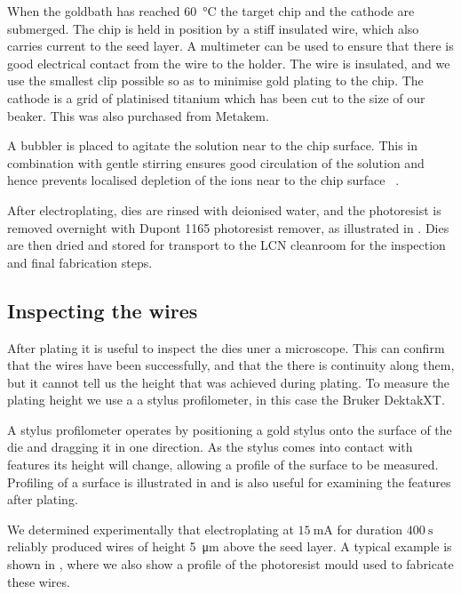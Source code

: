 When the goldbath has reached \SI{60}{\celsius} the target chip and the cathode
are submerged. The chip is held in position by a stiff insulated wire, which
also carries current to the seed layer. A multimeter can be used to ensure that
there is good electrical contact from the wire to the holder. The wire is
insulated, and we use the smallest clip possible so as to minimise gold plating
to the chip.  The cathode is a grid of platinised titanium which has been cut
to the size of our beaker.  This was also purchased from Metakem.


A bubbler is placed to agitate the solution near to the chip surface. This in
combination with gentle stirring ensures good circulation of the solution and
hence prevents localised depletion of the ions near to the chip
surface~\cite{Schlesinger2011} .

After electroplating, dies are rinsed with deionised water, and the photoresist
is removed overnight with Dupont 1165 photoresist remover, as illustrated
in . Dies are then
dried and stored for transport to the LCN cleanroom for the inspection and
final fabrication steps.


\subsection{Inspecting the wires}
\label{fab:inspwire}

After plating it is useful to inspect the dies uner a microscope. This can
confirm that the wires have been  successfully, and that the there
is continuity along them, but it cannot tell us the height that was achieved
during plating. To measure the plating height we use a a stylus profilometer,
in this case the Bruker DektakXT.

A stylus profilometer operates by positioning a gold stylus onto the surface of
the die and dragging it in one direction. As the stylus comes into contact with
features its height will change, allowing a profile of the surface to be
measured. Profiling of a surface is illustrated in 
and is also useful for examining the features after plating.

We determined experimentally that electroplating at $\SI{15}{\milli\ampere}$
for duration $\SI{400}{\second}$ reliably produced wires of height
\SI{5}{\micro\meter} above the seed layer. A typical example is shown in
, where we also show a profile of the photoresist
mould used to fabricate these wires.

